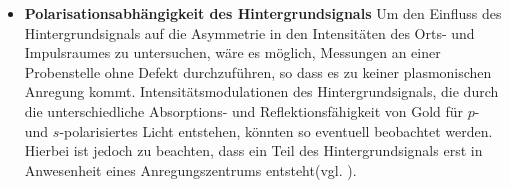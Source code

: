 \documentclass[a4paper, titlepage,  ngerman, fullpage]{book}
\begin{document}
\begin{itemize}
		\item \textbf{Polarisationsabhängigkeit des Hintergrundsignals} Um den Einfluss des Hintergrundsignals auf die Asymmetrie in den Intensitäten des Orts- und Impulsraumes zu untersuchen, wäre es möglich, Messungen an einer Probenstelle ohne Defekt durchzuführen, so dass es zu keiner plasmonischen Anregung kommt. Intensitätsmodulationen des Hintergrundsignals, die durch die unterschiedliche Absorptions- und Reflektionsfähigkeit von Gold für $p$- und $s$-polarisiertes Licht entstehen, könnten so eventuell beobachtet werden. Hierbei ist jedoch zu beachten, dass ein Teil des Hintergrundsignals erst in Anwesenheit eines Anregungszentrums entsteht(vgl. \cite{Drezet.2008}).
	\end{itemize}
	
	\newpage
	\appendix
		
		\listoffigures
	\newpage
\end{document}

